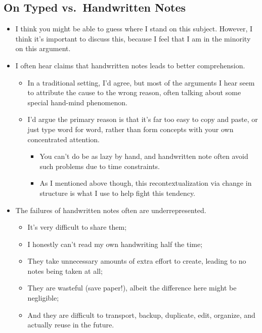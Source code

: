 \documentclass{inVerba-notes}
\begin{document}
\begin{itemize}
    \subsection{On Typed vs.\ Handwritten Notes}
    \begin{itemize}
        \item I think you might be able to guess where I stand on this subject. However, I think it's important to discuss this, because I feel that I am in the minority on this argument. 
        \item I often hear claims that handwritten notes leads to better comprehension.
            \begin{itemize}
                \item In a traditional setting, I'd agree, but most of the arguments I hear seem to attribute the cause to the wrong reason, often talking about some special hand-mind phenomenon. 
                \item I'd argue the primary reason is that it's far too easy to copy and paste, or just type word for word, rather than form concepts with your own concentrated attention.
                    \begin{itemize}
                        \item You can't do be as lazy by hand, and handwritten note often avoid such problems due to time constraints.
                        \item As I mentioned above though, this recontextualization via change in structure is what I use to help fight this tendency.
                    \end{itemize}
            \end{itemize}
        \item The failures of handwritten notes often are underrepresented.
            \begin{itemize}
                \item It's very difficult to share them;
                \item I honestly can't read my own handwriting half the time;
                \item They take unnecessary amounts of extra effort to create, leading to no notes being taken at all;
                \item They are wasteful (save paper!), albeit the difference here might be negligible;
                \item And they are difficult to transport, backup, duplicate, edit, organize, and actually reuse in the future.

\end{itemize}
\end{itemize}
\end{itemize}
\end{document}
